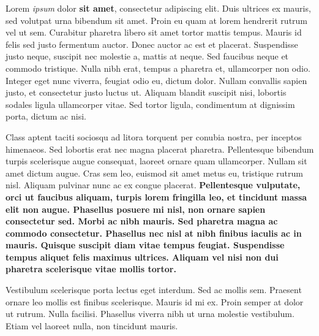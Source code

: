\documentclass{article}
\begin{document}
Lorem {\it ipsum} dolor {\bf sit amet}, consectetur adipiscing
elit. Duis ultrices ex mauris, sed volutpat urna bibendum sit
amet. Proin eu quam at lorem hendrerit rutrum vel ut sem. Curabitur
pharetra libero sit amet tortor mattis tempus. Mauris id felis sed
justo fermentum auctor. Donec auctor ac est et placerat. Suspendisse
justo neque, suscipit nec molestie a, mattis at neque. Sed faucibus
neque et commodo tristique. Nulla nibh erat, tempus a pharetra et,
ullamcorper non odio. Integer eget nunc viverra, feugiat odio eu,
dictum dolor. Nullam convallis sapien justo, et consectetur justo
luctus ut. Aliquam blandit suscipit nisi, lobortis sodales ligula
ullamcorper vitae. Sed tortor ligula, condimentum at dignissim porta,
dictum ac nisi.

Class aptent taciti sociosqu ad litora torquent per conubia nostra,
per inceptos himenaeos. Sed lobortis erat nec magna placerat
pharetra. Pellentesque bibendum turpis scelerisque augue consequat,
laoreet ornare quam ullamcorper. Nullam sit amet dictum augue. Cras
sem leo, euismod sit amet metus eu, tristique rutrum nisl. Aliquam
pulvinar nunc ac ex congue placerat. \bf Pellentesque vulputate, orci
ut faucibus aliquam, turpis lorem fringilla leo, et tincidunt massa
elit non augue. Phasellus posuere mi nisl, non ornare sapien
consectetur sed. Morbi ac nibh mauris. Sed pharetra magna ac commodo
consectetur. Phasellus nec nisl at nibh finibus iaculis ac in
mauris. Quisque suscipit diam vitae tempus feugiat. Suspendisse tempus
aliquet felis maximus ultrices. Aliquam vel nisi non dui pharetra
scelerisque vitae mollis tortor.

Vestibulum scelerisque porta lectus eget interdum. Sed ac mollis
sem. Praesent ornare leo mollis est finibus scelerisque. Mauris id mi
ex. Proin semper at dolor ut rutrum. Nulla facilisi. Phasellus viverra
nibh ut urna molestie vestibulum. Etiam vel laoreet nulla, non
tincidunt mauris.
\end{document}
